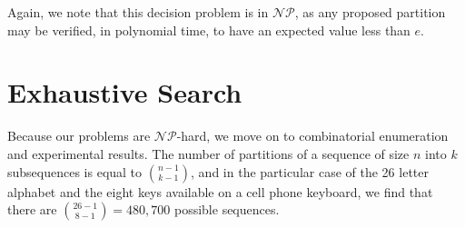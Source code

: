 \documentclass[runningheads]{llncs}
\newcommand{\NP}{\ensuremath{\mathcal{NP}}}
\begin{document}
Again, we note that this decision problem is in \NP, as any proposed partition may be verified, in polynomial time, to have an expected value less than $e$.

\section{Exhaustive Search}

Because our problems are \NP-hard, we move on to combinatorial enumeration and experimental results.  The number of partitions of a sequence of size $n$ into $k$ subsequences is equal to $\binom{n-1}{k-1}$, and in the particular case of the 26 letter alphabet and the eight keys available on a cell phone keyboard, we find that there are $\binom{26-1}{8-1} = 480,700$ possible sequences.



\end{document}
